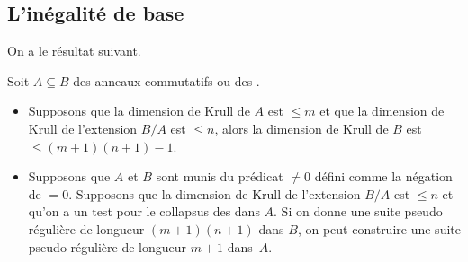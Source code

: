 \subsection{L'inégalité de base} 

On a le résultat \cof suivant.
\begin{theorem} 
\label{thDim1} 
Soit $A\subseteq B$ des anneaux commutatifs ou des \trdis. 
\begin{itemize}
\item [$(1)$] Supposons que la dimension de Krull de $A$ est $\leq m$ 
et que la dimension de Krull de l'extension $B/A$ est $\leq n$, 
alors  la dimension de Krull de $B$ est $\leq (m+1)(n+1)-1$.
\item [$(2)$] Supposons que $A$ et $B$ sont munis du prédicat $\neq0$
défini comme la négation de $=0$.
 Supposons que la dimension de Krull de l'extension $B/A$ 
est $\leq n$ et qu'on a un test pour le collapsus des \proels dans $A$. Si 
on donne une suite pseudo régulière de longueur $(m+1)(n+1)$  dans 
$B$, on peut construire une suite pseudo régulière de longueur $m+1$  
dans~$A$.
\end{itemize}
\end{theorem}

